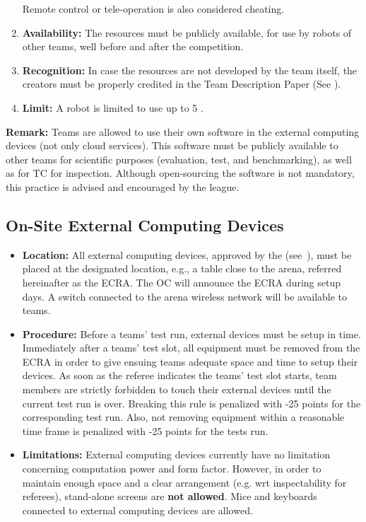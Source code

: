 \begin{enumerate}
	  Remote control or tele-operation is also considered cheating. 
	\item \textbf{Availability:} The resources must be publicly available, for use by robots of other teams, well before and after the competition.
	\item \textbf{Recognition:} In case the resources are not developed by the team itself, the creators must be properly credited in the Team Description Paper (See ).
	\item \textbf{Limit:} A robot is limited to use up to 5 . 
\end{enumerate}

\textbf{Remark:} Teams are allowed to use their own software in the external computing devices (not only cloud services). This software must be publicly available to other teams for scientific purposes (evaluation, test, and benchmarking), as well as for TC for inspection. Although open-sourcing the software is not mandatory, this practice is advised and encouraged by the league.

\subsection{On-Site External Computing Devices}
\label{rule:robot_external_computing_devices}

\begin{itemize}
  \item \textbf{Location:} All external computing devices, approved by the 
  		(see~), must be placed at the designated location, e.g., a table close
        to the arena, referred hereinafter as the  {ECRA}. The OC will announce the ECRA during setup days. A switch connected to the arena
        wireless network will be available to teams.
  \item \textbf{Procedure:} Before a teams' test run, external devices must be setup in time.
  		Immediately after a teams' test slot, all equipment must be removed from the ECRA in order to give ensuing
        teams adequate space and time to setup their devices. As soon as the referee indicates the teams' test slot
        starts, team members are strictly forbidden to touch their external devices until the current test run is over.
        Breaking this  rule is penalized with -25 points for the corresponding test run. Also, not removing
        equipment within a reasonable time frame is penalized with -25 points for the tests run.
  \item \textbf{Limitations:} External computing devices currently have no limitation concerning computation
  		power and form factor. However, in order to maintain enough space and a	clear arrangement (e.g. wrt
        inspectability for referees), stand-alone screens are \textbf{not allowed}. Mice and keyboards connected
        to external computing devices are allowed.
\end{itemize}

